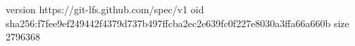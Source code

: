 version https://git-lfs.github.com/spec/v1
oid sha256:f7fee9ef249442f4379d737b497ffcba2ec2e639fc0f227e8030a3ffa66a660b
size 2796368

